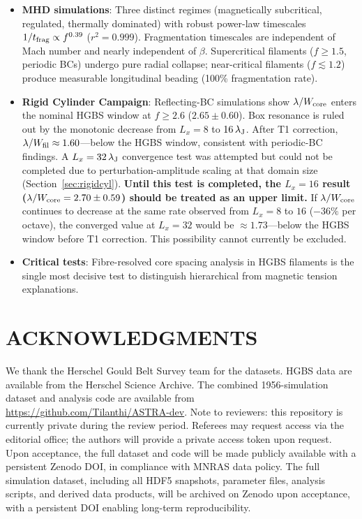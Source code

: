 \documentclass[twoside,twocolumn]{mnras}
\begin{document}
\begin{itemize}
    \item \textbf{MHD simulations}: Three distinct regimes (magnetically subcritical,
    regulated, thermally dominated) with robust power-law timescales
    $1/t_{\rm frag} \propto f^{0.39}$ ($r^2 = 0.999$). Fragmentation timescales are
    independent of Mach number and nearly independent of $\beta$. Supercritical filaments
    ($f \geq 1.5$, periodic BCs) undergo pure radial collapse; near-critical filaments
    ($f \lesssim 1.2$) produce measurable longitudinal beading (100\% fragmentation rate).

    \item \textbf{Rigid Cylinder Campaign}: Reflecting-BC simulations show $\lambda/W_{\rm core}$
    enters the nominal HGBS window at $f \geq 2.6$ ($2.65 \pm 0.60$). Box resonance is
    ruled out by the monotonic decrease from $L_x = 8$ to $16\,\lambda_{\rm J}$.
    After T1 correction, $\lambda/W_{\rm fil} \approx 1.60$---below the HGBS window,
    consistent with periodic-BC findings. A $L_x = 32\,\lambda_{\rm J}$ convergence test was attempted but could not be completed due to perturbation-amplitude scaling at that domain size (Section~\ref{sec:rigidcyl}). \textbf{Until this test is completed, the $L_x = 16$ result ($\lambda/W_{\rm core} = 2.70 \pm 0.59$) should be treated as an upper limit.} If $\lambda/W_{\rm core}$ continues to decrease at the same rate observed from $L_x = 8$ to $16$ ($-36\%$ per octave), the converged value at $L_x = 32$ would be $\approx 1.73$---below the HGBS window before T1 correction. This possibility cannot currently be excluded.

    \item \textbf{Critical tests}: Fibre-resolved core spacing analysis in HGBS
    filaments is the single most decisive test to distinguish hierarchical from magnetic
    tension explanations.

\end{itemize}

\section*{ACKNOWLEDGMENTS}

We thank the Herschel Gould Belt Survey team for the datasets. HGBS data are available
from the Herschel Science Archive. The combined 1956-simulation dataset and analysis code are available from
\url{https://github.com/Tilanthi/ASTRA-dev}. Note to reviewers: this repository is currently private during the review period.
Referees may request access via the editorial office; the authors will provide a
private access token upon request. Upon acceptance, the full dataset and code will
be made publicly available with a persistent Zenodo DOI, in compliance with MNRAS
data policy. The full simulation
dataset, including all HDF5 snapshots, parameter files, analysis scripts, and derived
data products, will be archived on Zenodo upon acceptance, with a persistent DOI enabling
long-term reproducibility.



\end{document}
